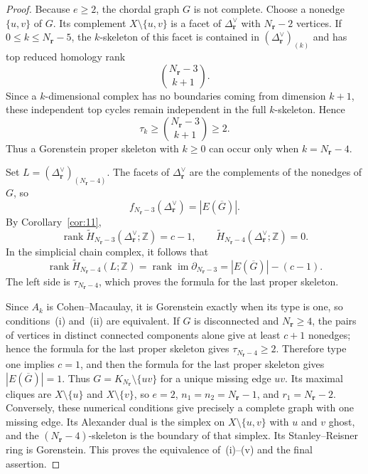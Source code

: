 \documentclass[11pt]{amsart}
\theoremstyle{definition}
\theoremstyle{remark}
\begin{document}
	\begin{proof}
		Because $e\ge2$, the chordal graph $G$ is not complete. Choose a nonedge $\{u,v\}$ of $G$. Its complement $X\setminus\{u,v\}$ is a facet of $\Delta_{\mathbf r}^\vee$ with $N_{\mathbf r}-2$ vertices. If $0\le k\le N_{\mathbf r}-5$, the $k$-skeleton of this facet is contained in $(\Delta_{\mathbf r}^\vee)_{(k)}$ and has top reduced homology rank
		\[
		\binom{N_{\mathbf r}-3}{k+1}.
		\]
		Since a $k$-dimensional complex has no boundaries coming from dimension $k+1$, these independent top cycles remain independent in the full $k$-skeleton. Hence
		\[
		\tau_k\ge\binom{N_{\mathbf r}-3}{k+1}\ge2.
		\]
		Thus a Gorenstein proper skeleton with $k\ge0$ can occur only when $k=N_{\mathbf r}-4$.
		
		Set $L=(\Delta_{\mathbf r}^\vee)_{(N_{\mathbf r}-4)}$. The facets of $\Delta_{\mathbf r}^\vee$ are the complements of the nonedges of $G$, so
		\[
		f_{N_{\mathbf r}-3}(\Delta_{\mathbf r}^\vee)=|E(\overline G)|.
		\]
		By Corollary~\ref{cor:11},
		\[
		\operatorname{rank}\widetilde H_{N_{\mathbf r}-3}(\Delta_{\mathbf r}^\vee;\mathbb Z)=c-1,
		\qquad
		\widetilde H_{N_{\mathbf r}-4}(\Delta_{\mathbf r}^\vee;\mathbb Z)=0.
		\]
		In the simplicial chain complex, it follows that
		\[
		\operatorname{rank}\widetilde H_{N_{\mathbf r}-4}(L;\mathbb Z)
		=\operatorname{rank}\operatorname{im}\partial_{N_{\mathbf r}-3}
		=|E(\overline G)|-(c-1).
		\]
		The left side is $\tau_{N_{\mathbf r}-4}$, which proves the formula for the last proper skeleton.
		
		Since $A_k$ is Cohen--Macaulay, it is Gorenstein exactly when its type is one, so conditions~(i) and~(ii) are equivalent. If $G$ is disconnected and $N_{\mathbf r}\ge4$, the pairs of vertices in distinct connected components alone give at least $c+1$ nonedges; hence the formula for the last proper skeleton gives $\tau_{N_{\mathbf r}-4}\ge2$. Therefore type one implies $c=1$, and then the formula for the last proper skeleton gives $|E(\overline G)|=1$. Thus $G=K_{N_{\mathbf r}}\setminus\{uv\}$ for a unique missing edge $uv$. Its maximal cliques are $X\setminus\{u\}$ and $X\setminus\{v\}$, so $e=2$, $n_1=n_2=N_{\mathbf r}-1$, and $r_1=N_{\mathbf r}-2$. Conversely, these numerical conditions give precisely a complete graph with one missing edge. Its Alexander dual is the simplex on $X\setminus\{u,v\}$ with $u$ and $v$ ghost, and the $(N_{\mathbf r}-4)$-skeleton is the boundary of that simplex. Its Stanley--Reisner ring is Gorenstein. This proves the equivalence of~(i)--(v) and the final assertion.
	\end{proof}
	
\end{document}
